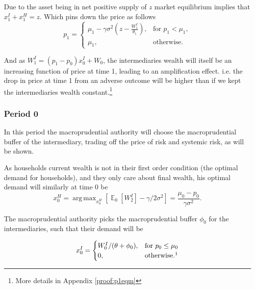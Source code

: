 \documentclass[11pt]{article}
\DeclareMathOperator{\E}{\mathbb{E}} %
\DeclareMathOperator*{\argmax}{arg\,max} %
\begin{document}
Due to the asset being in net positive supply of $z$ market equilibrium implies that $x^I_1 + x^H_1 = z$. Which pins down the price as follows
\begin{equation}
p_1 = \begin{cases}
\mu_1 - \gamma\sigma^2 \left(z-\frac{W^I_1}{\theta_1}\right), &\text{for } p_1 < \mu_1,\\
\mu_1, &\text{otherwise.}
\end{cases}
\end{equation}

And as $W^I_1 = (p_1 - p_0)x^I_0 + W_0$, the intermediaries wealth will itself be an increasing function of price at time 1, leading to an amplification effect. i.e. the drop in price at time 1 from an adverse outcome will be higher than if we kept the intermediaries wealth constant.\footnote{More details in Appendix \ref{proof:p1eqm}}

\subsubsection*{Period 0}
In this period the macroprudential authority will choose the macroprudential buffer of the intermediary, trading off the price of risk and systemic risk, as will be shown.

As households current wealth is not in their first order condition (the optimal demand for households), and they only care about final wealth, his optimal demand will similarly at time 0 be
\begin{equation}
x^{H}_0 = \argmax_{x^H_0}\left[\E_0[W^I_2] - \gamma/2\sigma^2\right]
= \frac{\mu_0 - p_0}{\gamma\sigma^2}.
\end{equation} 

The macroprudential authority picks the macroprudential buffer $\phi_0$ for the intermediaries, such that their demand will be

\begin{equation}
x^I_0 = \begin{cases}
 W^I_0/(\theta + \phi_0), &\text{for $p_0 \leq \mu_0$}\\
 0, &\text{otherwise.\footnotemark}
\end{cases}
\end{equation}
\end{document}
